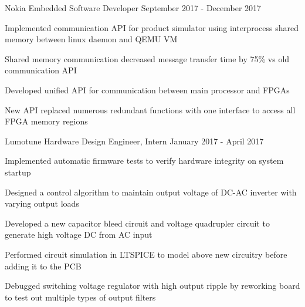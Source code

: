 

\begin{cventries}

  \cventry
    {Nokia} %
    {Embedded Software Developer} %
    {September 2017 - December 2017} %
    {}
    {
      \begin{cvitems} %
        \item {Implemented communication API for product simulator using interprocess shared memory between linux daemon and QEMU VM}
        \item {Shared memory communication decreased message transfer time by 75\% vs old communication API}
        \item {Developed unified API for communication between main processor and FPGAs}
        \item {New API replaced numerous redundant functions with one interface to access all FPGA memory regions}
      \end{cvitems}
    }

  \cventry
    {Lumotune} %
    {Hardware Design Engineer, Intern} %
    {January 2017 - April 2017} %
    {}
    {
      \begin{cvitems} %
        \item {Implemented automatic firmware tests to verify hardware integrity on system startup}
        \item {Designed a control algorithm to maintain output voltage of DC-AC inverter with varying output loads}
        \item {Developed a new capacitor bleed circuit and voltage quadrupler circuit to generate high voltage DC from AC input}
        \item {Performed circuit simulation in LTSPICE to model above new circuitry before adding it to the PCB}
        \item {Debugged switching voltage regulator with high output ripple by reworking board to test out multiple types of output filters}
      \end{cvitems}
    }


\end{cventries}
